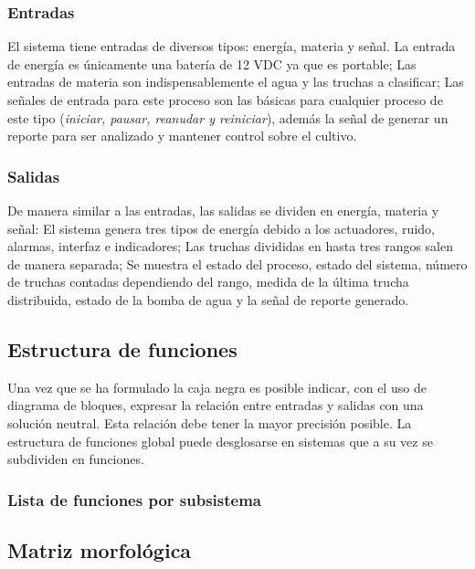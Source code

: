 \subsubsection{Entradas}

El sistema tiene entradas de diversos tipos: energía, materia y señal. La entrada de energía es únicamente una batería de 12 VDC ya que es portable; Las entradas de materia son indispensablemente el agua y las truchas a clasificar; Las señales de entrada para este proceso son las básicas para cualquier proceso de este tipo (\textit{iniciar, pausar, reanudar y reiniciar}), además la señal de generar un reporte para ser analizado y mantener control sobre el cultivo.

\subsubsection{Salidas}

De manera similar a las entradas, las salidas se dividen en energía, materia y señal: El sistema genera tres tipos de energía debido a los actuadores, ruido, alarmas, interfaz e indicadores; Las truchas divididas en hasta tres rangos salen de manera separada; Se muestra el estado del proceso, estado del sistema, número de truchas contadas dependiendo del rango, medida de la última trucha distribuida, estado de la bomba de agua y la señal de reporte generado.

\subsection{Estructura de funciones}

Una vez que se ha formulado la caja negra es posible indicar, con el uso de diagrama de bloques, expresar la relación entre entradas y salidas con una solución neutral. Esta relación debe tener la mayor precisión posible. La estructura de funciones global puede desglosarse en sistemas que a su vez se subdividen en funciones.\cite[p.~169-181]{Pahl2007}

\subsubsection{Lista de funciones por subsistema}

\subsection{Matriz morfológica}

